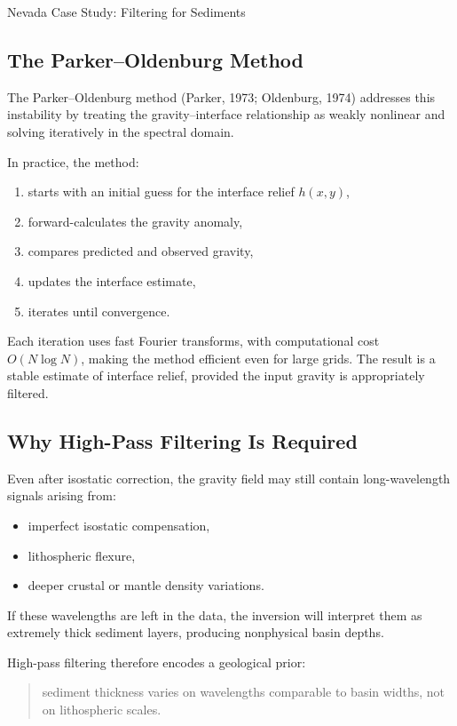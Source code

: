 \begin{activity}{Nevada Case Study: Filtering for Sediments}
\subsection*{The Parker--Oldenburg Method}

The Parker--Oldenburg method (Parker, 1973; Oldenburg, 1974) addresses this instability
by treating the gravity--interface relationship as weakly nonlinear
and solving iteratively in the spectral domain.

In practice, the method:
\begin{enumerate}
  \item starts with an initial guess for the interface relief $h(x,y)$,
  \item forward-calculates the gravity anomaly,
  \item compares predicted and observed gravity,
  \item updates the interface estimate,
  \item iterates until convergence.
\end{enumerate}

Each iteration uses fast Fourier transforms, with computational cost
$O(N\log N)$, making the method efficient even for large grids.
The result is a stable estimate of interface relief, provided the input gravity
is appropriately filtered.

\subsection*{Why High-Pass Filtering Is Required}

Even after isostatic correction, the gravity field may still contain
long-wavelength signals arising from:
\begin{itemize}
  \item imperfect isostatic compensation,
  \item lithospheric flexure,
  \item deeper crustal or mantle density variations.
\end{itemize}

If these wavelengths are left in the data,
the inversion will interpret them as extremely thick sediment layers,
producing nonphysical basin depths.

High-pass filtering therefore encodes a geological prior:
\begin{quote}
sediment thickness varies on wavelengths comparable to basin widths,
not on lithospheric scales.
\end{quote}


\end{activity}
